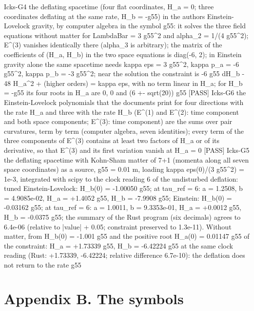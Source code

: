 \documentclass[
  10pt,
]{article}
\newenvironment{Shaded}{}{}
\newcommand{\NormalTok}[1]{#1}
\begin{document}
\begin{Shaded}
\begin{Highlighting}[]
\NormalTok{[PASS] Icks{-}G4  the deflating spacetime (four flat coordinates, H\_a = 0; three coordinates deflating at the same rate, H\_b = {-}g55) in the author\textquotesingle{}s Einstein{-}Lovelock gravity, by computer algebra in the symbol g55: it solves the three field equations without matter for LambdaBar = 3 g55\^{}2 and alpha\_2 = 1/(4 g55\^{}2); E\^{}(3) vanishes identically there (alpha\_3 is arbitrary); the matrix of the coefficients of (H\_a\textquotesingle{}, H\_b\textquotesingle{}) in the two space equations is diag({-}6, 2); in Einstein gravity alone the same spacetime needs kappa eps = 3 g55\^{}2, kappa p\_a = {-}6 g55\^{}2, kappa p\_b = {-}3 g55\^{}2; near the solution the constraint is {-}6 g55 dH\_b {-} 48 H\_a\^{}2 + (higher orders) = kappa eps, with no term linear in H\_a; for H\_b = {-}g55 its four roots in H\_a are 0, 0 and (6 +{-} sqrt(20)) g55}
\NormalTok{[PASS] Icks{-}G6  the Einstein{-}Lovelock polynomials that the documents print for four directions with the rate H\_a and three with the rate H\_b (E\^{}(1) and E\^{}(2): time component and both space components; E\^{}(3): time component) are the sums over pair curvatures, term by term (computer algebra, seven identities); every term of the three components of E\^{}(3) contains at least two factors of H\_a or of its derivative, so that E\^{}(3) and its first variation vanish at H\_a = 0}
\NormalTok{[PASS] Icks{-}G5  the deflating spacetime with Kohn{-}Sham matter of 7+1 (momenta along all seven space coordinates) as a source, g55 = 0.01 m, loading kappa eps(0)/(3 g55\^{}2) = 1e{-}3, integrated with scipy to the clock reading 6 of the undisturbed deflation: tuned Einstein{-}Lovelock: H\_b(0) = {-}1.00050 g55; at tau\_ref = 6: a = 1.2508, b = 4.9085e{-}02, H\_a = +1.4052 g55, H\_b = {-}7.9908 g55; Einstein: H\_b(0) = {-}0.03162 g55; at tau\_ref = 6: a = 1.0011, b = 9.3353e{-}01, H\_a = +0.0012 g55, H\_b = {-}0.0375 g55; the summary of the Rust program (six decimals) agrees to 6.4e{-}06 (relative to |value| + 0.05; constraint preserved to 1.3e{-}11). Without matter, from H\_b(0) = {-}1.001 g55 and the positive root H\_a(0) = 0.01147 g55 of the constraint: H\_a = +1.73339 g55, H\_b = {-}6.42224 g55 at the same clock reading (Rust: +1.73339, {-}6.42224; relative difference 6.7e{-}10): the deflation does not return to the rate g55}
\end{Highlighting}
\end{Shaded}

\hypertarget{appendix-b.-the-symbols}{%
\section{Appendix B. The symbols}\label{appendix-b.-the-symbols}}
\end{document}
